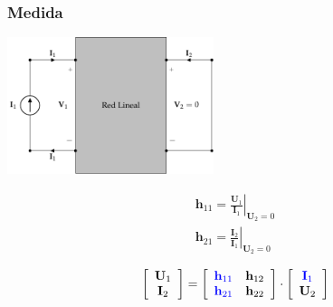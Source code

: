 \documentclass[10pt]{article}
\begin{document}
\subsubsection*{Medida}

\begin{minipage}{0.5\textwidth}
  \begin{center}
    \includegraphics[height=4cm]{../figs/parametrosH_entrada.pdf}
  \end{center}
\end{minipage}
\begin{minipage}{0.5\textwidth}
  \[
    \begin{array}{c}
      \mathbf{h}_{11} = \left.\frac{\mathbf{U}_1}{\mathbf{I}_1}\right\rvert_{\mathbf{U}_2 = 0} \\
      \mathbf{h}_{21} = \left.\frac{\mathbf{I}_2}{\mathbf{I}_1}\right\rvert_{\mathbf{U}_2 = 0}
    \end{array}
  \]

  \[
    \left[
      \begin{array}{c}
        \mathbf{U}_1\\
        \mathbf{I}_2
      \end{array}
    \right] =
    \left[
      \begin{array}{cc}
        \color{blue}{\mathbf{h}_{11}} & \mathbf{h}_{12}\\
        \color{blue}{\mathbf{h}_{21}} & \mathbf{h}_{22}
      \end{array}
    \right] \cdot
    \left[
      \begin{array}{c}
        \color{blue}{\mathbf{I}_1}\\
        \mathbf{U}_2
      \end{array}
    \right]
  \]
\end{minipage}

\vspace{1cm}
\end{document}
